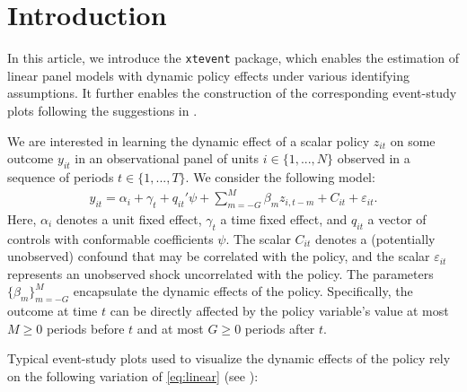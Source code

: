 \documentclass[12pt]{article}
\begin{document}


\doublespacing
\cleardoublepage%
\vspace{-1cm}


\section{Introduction}
\label{sec:intro}
In this article, we introduce the \texttt{xtevent} package, which enables the estimation of linear panel models with dynamic policy effects under various identifying assumptions. It further enables the construction of the corresponding event-study plots following the suggestions in \cite{freyaldenhoven2021visualizationforth}.

We are interested in learning the dynamic effect of a scalar policy $z_{it}$ on some outcome $y_{it}$ in an observational panel of units $i\in\{1,...,N\}$ observed in a sequence of periods $t\in\{1,...,T\}$. We consider the following model:
\begin{align}
y_{it} =  \alpha_{i} + \gamma_{t} + q_{it}'\psi  + \sum_{m=-G}^{M}\beta_m z_{i,t-m} + C_{it} + \varepsilon_{it}. \label{eq:linear}
\end{align}
Here, $\alpha_i$ denotes a unit fixed effect, $\gamma_t$ a time fixed effect, and $q_{it}$ a vector of controls with conformable coefficients $\psi$.
The scalar $C_{it}$ denotes a (potentially unobserved) confound that may be correlated with the policy, and the scalar $\varepsilon_{it}$ represents an unobserved shock uncorrelated with the policy.
The parameters $\{\beta_{m}\}_{m=-G}^{M}$ encapsulate the dynamic effects of the policy.
Specifically, the outcome at time $t$ can be directly affected by the policy variable's value at most $M \ge 0$ periods before $t$ and at most $G \geq 0 $ periods after $t$.


Typical event-study plots used to visualize the dynamic effects of the policy rely on the following variation of \eqref{eq:linear} (see \citeauthor{freyaldenhoven2021visualizationforth} \citeyear{freyaldenhoven2021visualizationforth}):
\end{document}
